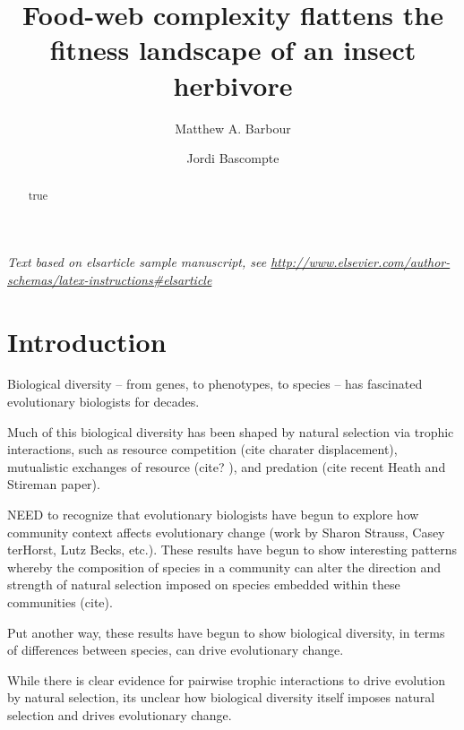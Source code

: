 \documentclass[]{elsarticle} %
\begin{document}
\begin{frontmatter}

  \title{Food-web complexity flattens the fitness landscape of an insect
herbivore}
    \author[Department of Evolutionary Biology and Environmental Studies, University
of Zurich, Zurich, Switzerland]{Matthew A. Barbour}
    \author[Another University]{Jordi Bascompte}
  
      \address[Some Institute of Technology]{Department, Street, City, State, Zip}
    \address[Another University]{Department, Street, City, State, Zip}
  
  \begin{abstract}
  true
  \end{abstract}
  
 \end{frontmatter}

\emph{Text based on elsarticle sample manuscript, see
\url{http://www.elsevier.com/author-schemas/latex-instructions\#elsarticle}}

\section{Introduction}\label{introduction}

Biological diversity -- from genes, to phenotypes, to species -- has
fascinated evolutionary biologists for decades.

Much of this biological diversity has been shaped by natural selection
via trophic interactions, such as resource competition (cite charater
displacement), mutualistic exchanges of resource (cite? ), and predation
(cite recent Heath and Stireman paper).

NEED to recognize that evolutionary biologists have begun to explore how
community context affects evolutionary change (work by Sharon Strauss,
Casey terHorst, Lutz Becks, etc.). These results have begun to show
interesting patterns whereby the composition of species in a community
can alter the direction and strength of natural selection imposed on
species embedded within these communities (cite).

Put another way, these results have begun to show biological diversity,
in terms of differences between species, can drive evolutionary change.

While there is clear evidence for pairwise trophic interactions to drive
evolution by natural selection, its unclear how biological diversity
itself imposes natural selection and drives evolutionary change.
\end{document}
